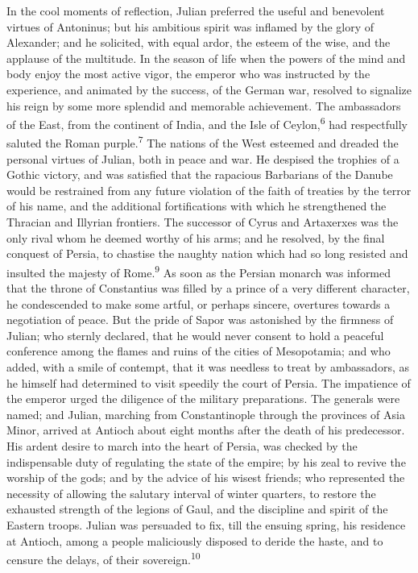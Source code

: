 In the cool moments of reflection, Julian preferred the useful
and benevolent virtues of Antoninus; but his ambitious spirit was
inflamed by the glory of Alexander; and he solicited, with equal
ardor, the esteem of the wise, and the applause of the multitude.
In the season of life when the powers of the mind and body enjoy
the most active vigor, the emperor who was instructed by the
experience, and animated by the success, of the German war,
resolved to signalize his reign by some more splendid and
memorable achievement. The ambassadors of the East, from the
continent of India, and the Isle of Ceylon,\textsuperscript{6} had respectfully
saluted the Roman purple.\textsuperscript{7} The nations of the West esteemed and
dreaded the personal virtues of Julian, both in peace and war. He
despised the trophies of a Gothic victory, and was satisfied that
the rapacious Barbarians of the Danube would be restrained from
any future violation of the faith of treaties by the terror of
his name, and the additional fortifications with which he
strengthened the Thracian and Illyrian frontiers. The successor
of Cyrus and Artaxerxes was the only rival whom he deemed worthy
of his arms; and he resolved, by the final conquest of Persia, to
chastise the naughty nation which had so long resisted and
insulted the majesty of Rome.\textsuperscript{9} As soon as the Persian monarch
was informed that the throne of Constantius was filled by a
prince of a very different character, he condescended to make
some artful, or perhaps sincere, overtures towards a negotiation
of peace. But the pride of Sapor was astonished by the firmness
of Julian; who sternly declared, that he would never consent to
hold a peaceful conference among the flames and ruins of the
cities of Mesopotamia; and who added, with a smile of contempt,
that it was needless to treat by ambassadors, as he himself had
determined to visit speedily the court of Persia. The impatience
of the emperor urged the diligence of the military preparations.
The generals were named; and Julian, marching from Constantinople
through the provinces of Asia Minor, arrived at Antioch about
eight months after the death of his predecessor. His ardent
desire to march into the heart of Persia, was checked by the
indispensable duty of regulating the state of the empire; by his
zeal to revive the worship of the gods; and by the advice of his
wisest friends; who represented the necessity of allowing the
salutary interval of winter quarters, to restore the exhausted
strength of the legions of Gaul, and the discipline and spirit of
the Eastern troops. Julian was persuaded to fix, till the ensuing
spring, his residence at Antioch, among a people maliciously
disposed to deride the haste, and to censure the delays, of their
sovereign.\textsuperscript{10}


